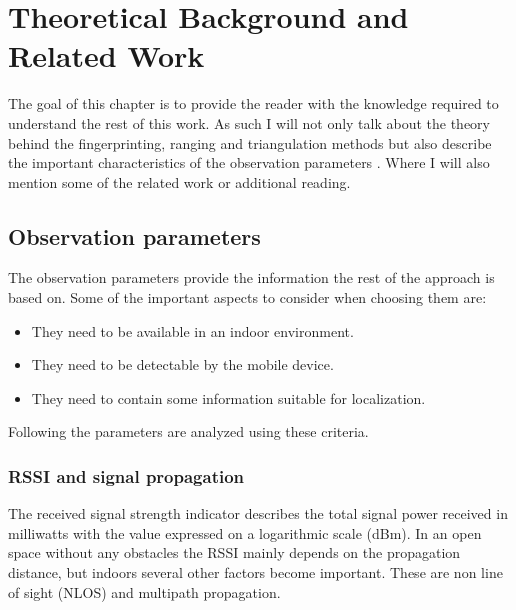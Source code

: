 
\chapter{Theoretical Background and Related Work} %

\label{Chapter2} %

The goal of this chapter is to provide the reader with the knowledge required to understand the rest of this work. As such I will not only talk about the theory behind the fingerprinting, ranging and triangulation methods but also describe the important characteristics of the observation parameters . Where  I will also mention some of the related work or additional reading.


\section{Observation parameters}

The observation parameters provide the information the rest of the approach is based on. Some of the important aspects to consider when choosing them are:
\begin{itemize}
\item They need to be available in an indoor environment.
\item They need to be detectable by the mobile device.
\item They need to contain some information suitable for localization.
\end{itemize}
Following the parameters are analyzed using these criteria.
\\
\subsection{RSSI and signal propagation}

The received signal strength indicator describes the total signal power received in milliwatts with the value expressed on a logarithmic scale (dBm)\cite[p.~160]{sauter2010gsm}.   In an open space without any obstacles the RSSI mainly depends on the propagation distance, but indoors several other factors become important. These are non line of sight (NLOS) and multipath propagation.

